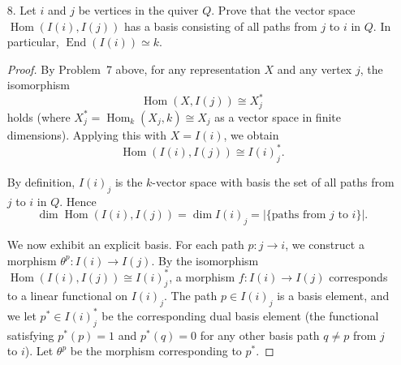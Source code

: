 \documentclass[12pt]{amsart}
\begin{document}
\begin{enumerate}
\begin{proof}
    \medskip\noindent\textbf{Conclusion.}
    Since all vector spaces are finite-dimensional, $M_i^*\cong M_i$ as vector spaces (non-canonically). Therefore
    \[
    \operatorname{Hom}(M,I(i))\cong M_i^*\cong M_i
    \]
    as $k$-vector spaces.
\end{proof}

\medskip

\bigskip


\item[8.] Let $i$ and $j$ be vertices in the quiver $Q$. Prove that the vector space $\operatorname{Hom}(I(i),I(j))$
has a basis consisting of all paths from $j$ to $i$ in $Q$. In particular, $\operatorname{End}(I(i))\simeq k$.

\begin{proof}
    By Problem~7 above, for any representation $X$ and any vertex $j$, the isomorphism
    \[
    \operatorname{Hom}(X,I(j))\cong X_j^*
    \]
    holds (where $X_j^*=\operatorname{Hom}_k(X_j,k)\cong X_j$ as a vector space in finite dimensions). Applying this with $X=I(i)$, we obtain
    \[
    \operatorname{Hom}(I(i),I(j))\cong I(i)_j^*.
    \]
    
    By definition, $I(i)_j$ is the $k$-vector space with basis the set of all paths from $j$ to $i$ in $Q$. Hence
    \[
    \dim\operatorname{Hom}(I(i),I(j)) = \dim I(i)_j = |\{\text{paths from } j \text{ to } i\}|.
    \]
    
    We now exhibit an explicit basis. For each path $p\colon j\to i$, we construct a morphism $\theta^p\colon I(i)\to I(j)$. By the isomorphism $\operatorname{Hom}(I(i),I(j))\cong I(i)_j^*$, a morphism $f\colon I(i)\to I(j)$ corresponds to a linear functional on $I(i)_j$. The path $p\in I(i)_j$ is a basis element, and we let $p^*\in I(i)_j^*$ be the corresponding dual basis element (the functional satisfying $p^*(p)=1$ and $p^*(q)=0$ for any other basis path $q\neq p$ from $j$ to $i$). Let $\theta^p$ be the morphism corresponding to $p^*$.
    

\end{proof}
\end{enumerate}
\end{document}
